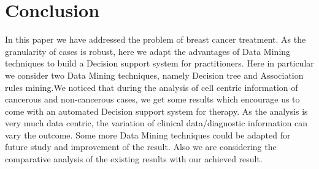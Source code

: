 \documentclass[conference]{IEEEtran}
\begin{document}




\section{Conclusion}
In this paper we have addressed the problem of breast cancer treatment. As the granularity of cases is robust,  here we adapt the advantages of Data Mining techniques to build a Decision support system for practitioners. Here in particular we consider two Data Mining techniques, namely Decision tree and Association rules mining.We noticed that during the analysis of cell centric information of cancerous and non-cancerous cases, we get some results which encourage us to come with an automated Decision support system for therapy. As the analysis is very much data centric, the variation of clinical data/diagnostic information can vary the outcome. Some more Data Mining techniques could be adapted for future study and improvement of the result. Also we are considering the  comparative analysis  of the existing results with our achieved result.







%
%





\end{document}
